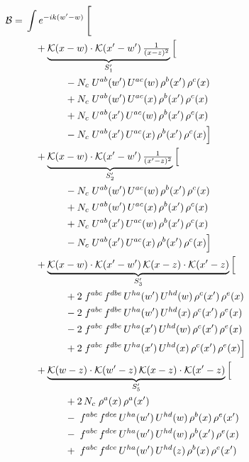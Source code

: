 \documentclass[10pt]{article}
\numberwithin{equation}{section}
\newcommand{\B}{\mathcal B}
\begin{document}
\begin{align}
\B={}&\int e^{-ik(w'-w)}\,\Bigg[\notag\\
&\quad +\underbrace{\mathcal{K}(x-w)\cdot\mathcal{K}(x'-w')\,\tfrac{1}{(x-z)^{2}}}_{S'_{1}}\Big[\notag\\
&\qquad\qquad -N_c\;U^{ab}(w')\,U^{ac}(w)\,\rho^{b}(x')\,\rho^{c}(x)\notag\\
&\qquad\qquad +N_c\;U^{ab}(w')\,U^{ac}(x)\,\rho^{b}(x')\,\rho^{c}(x)\notag\\
&\qquad\qquad +N_c\;U^{ab}(x')\,U^{ac}(w)\,\rho^{b}(x')\,\rho^{c}(x)\notag\\
&\qquad\qquad -N_c\;U^{ab}(x')\,U^{ac}(x)\,\rho^{b}(x')\,\rho^{c}(x)\Big]\notag\\
&\quad +\underbrace{\mathcal{K}(x-w)\cdot\mathcal{K}(x'-w')\,\tfrac{1}{(x'-z)^{2}}}_{S'_{2}}\Big[\notag\\
&\qquad\qquad -N_c\;U^{ab}(w')\,U^{ac}(w)\,\rho^{b}(x')\,\rho^{c}(x)\notag\\
&\qquad\qquad +N_c\;U^{ab}(w')\,U^{ac}(x)\,\rho^{b}(x')\,\rho^{c}(x)\notag\\
&\qquad\qquad +N_c\;U^{ab}(x')\,U^{ac}(w)\,\rho^{b}(x')\,\rho^{c}(x)\notag\\
&\qquad\qquad -N_c\;U^{ab}(x')\,U^{ac}(x)\,\rho^{b}(x')\,\rho^{c}(x)\Big]\notag\\
&\quad +\underbrace{\mathcal{K}(x-w)\cdot\mathcal{K}(x'-w')\,\mathcal{K}(x-z)\cdot\mathcal{K}(x'-z)}_{S'_{3}}\Big[\notag\\
&\qquad\qquad +2\;f^{abc}\,f^{dbe}\,U^{ha}(w')\,U^{hd}(w)\,\rho^{c}(x')\,\rho^{e}(x)\notag\\
&\qquad\qquad -2\;f^{abc}\,f^{dbe}\,U^{ha}(w')\,U^{hd}(x)\,\rho^{c}(x')\,\rho^{e}(x)\notag\\
&\qquad\qquad -2\;f^{abc}\,f^{dbe}\,U^{ha}(x')\,U^{hd}(w)\,\rho^{c}(x')\,\rho^{e}(x)\notag\\
&\qquad\qquad +2\;f^{abc}\,f^{dbe}\,U^{ha}(x')\,U^{hd}(x)\,\rho^{c}(x')\,\rho^{e}(x)\Big]\notag\\
&\quad +\underbrace{\mathcal{K}(w-z)\cdot\mathcal{K}(w'-z)\,\mathcal{K}(x-z)\cdot\mathcal{K}(x'-z)}_{S'_{5}}\Big[\notag\\
&\qquad\qquad +2\,N_c\;\rho^{a}(x)\,\rho^{a}(x')\notag\\
&\qquad\qquad -\;f^{abc}\,f^{dce}\,U^{ha}(w')\,U^{hd}(w)\,\rho^{b}(x)\,\rho^{e}(x')\notag\\
&\qquad\qquad -\;f^{abc}\,f^{dce}\,U^{ha}(w')\,U^{hd}(w)\,\rho^{b}(x')\,\rho^{e}(x)\notag\\
&\qquad\qquad +\;f^{abc}\,f^{dce}\,U^{ha}(w')\,U^{hd}(z)\,\rho^{b}(x)\,\rho^{e}(x')\notag\\

\end{align}
\end{document}
